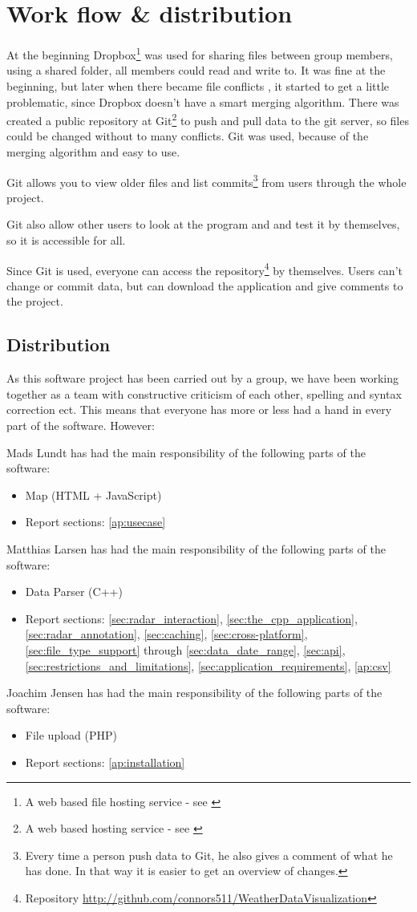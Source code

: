 \chapter{Work flow \& distribution}
\label{work_flow_and_distribution}
At the beginning Dropbox\footnote{A web based file hosting service - see \cite{Dropbox}} was used for sharing files between group members, using a shared folder, all members could read and write to. It was fine at the beginning, but later when there became file conflicts , it started to get a little problematic, since Dropbox doesn't have a smart merging algorithm.
There was created a public repository at Git\footnote{A web based hosting service - see \cite{Git}} to push and pull data to the git server, so files could be changed without to many conflicts. Git was used, because of the merging algorithm and easy to use.

Git allows you to view older files and list commits\footnote{Every time a person push data to Git, he also gives a comment of what he has done. In that way it is easier to get an overview of changes.} from users through the whole project.

Git also allow other users to look at the program and and test it by themselves, so it is accessible for all.

Since Git is used, everyone can access the repository\footnote{Repository \url{http://github.com/connors511/WeatherDataVisualization}} by themselves. Users can't change or commit data, but can download the application and give comments to the project.

\section{Distribution}
\label{sec:distribution}
As this software project has been carried out by a group, we have been working together as a team with constructive criticism of each other, spelling and syntax correction ect. This means that everyone has more or less had a hand in every part of the software. However:

Mads Lundt has had the main responsibility of the following parts of the software:
\begin{itemize}
\item Map (HTML + JavaScript)
\item Report sections: \ref{ap:usecase}
\end{itemize}

Matthias Larsen has had the main responsibility of the following parts of the software:
\begin{itemize}
\item Data Parser (C++)
\item Report sections: \ref{sec:radar_interaction}, \ref{sec:the_cpp_application}, \ref{sec:radar_annotation}, \ref{sec:caching}, \ref{sec:cross-platform}, \ref{sec:file_type_support} through \ref{sec:data_date_range}, \ref{sec:api}, \ref{sec:restrictions_and_limitations}, \ref{sec:application_requirements}, \ref{ap:csv}
\end{itemize}

Joachim Jensen has had the main responsibility of the following parts of the software:
\begin{itemize}
\item File upload (PHP)
\item Report sections: \ref{ap:installation}
\end{itemize}